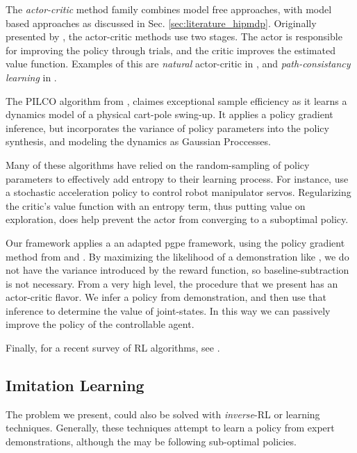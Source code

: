     The \textit{actor-critic} method family combines model free approaches, with model based approaches as discussed in
    Sec. \ref{sec:literature_hipmdp}. Originally presented by \cite{konda2000actor}, the actor-critic methods use two
    stages. The actor is responsible for improving the policy through trials, and the critic improves the estimated
    value function. Examples of this are \textit{natural} actor-critic in \cite{peters2008reinforcement}, and
    \textit{path-consistancy learning} in \cite{nachum2017bridging}.

    The PILCO algorithm from \cite{deisenroth2011pilco}, claimes exceptional sample efficiency as it learns a dynamics
    model of a physical cart-pole swing-up. It applies a policy gradient inference, but incorporates the variance of
    policy parameters into the policy synthesis, and modeling the dynamics as Gaussian Proccesses.

    Many of these algorithms have relied on the random-sampling of policy parameters to effectively add entropy to their
    learning process. For instance, \cite{peters2008reinforcement} use a stochastic acceleration policy to control robot
    manipulator servos. Regularizing the critic's value function with an entropy term, thus putting value on
    exploration, \cite{nachum2017bridging} does help prevent the actor from converging to a suboptimal policy.

    Our framework applies a an adapted \ac{pgpe} framework, using the policy gradient method from
    \cite{tangkaratt2014model} and \cite{Sugiyama2015StatisticalRL}. By maximizing the likelihood of a demonstration
    like \cite{herman2016inverse}, we do not have the variance introduced by the reward function, so
    baseline-subtraction is not necessary. From a very high level, the procedure that we present has an actor-critic
    flavor. We infer a policy from demonstration, and then use that inference to determine the value of joint-states. In
    this way we can passively improve the policy of the controllable agent.

    Finally, for a recent survey of \ac{RL} algorithms, see \cite{polydoros2017survey}.

\subsection{Imitation Learning}

    The problem we present, could also be solved with  \textit{inverse}-\ac{RL} or  learning techniques.
    Generally, these techniques attempt to learn a policy from expert demonstrations, although the
     may be following sub-optimal policies.

